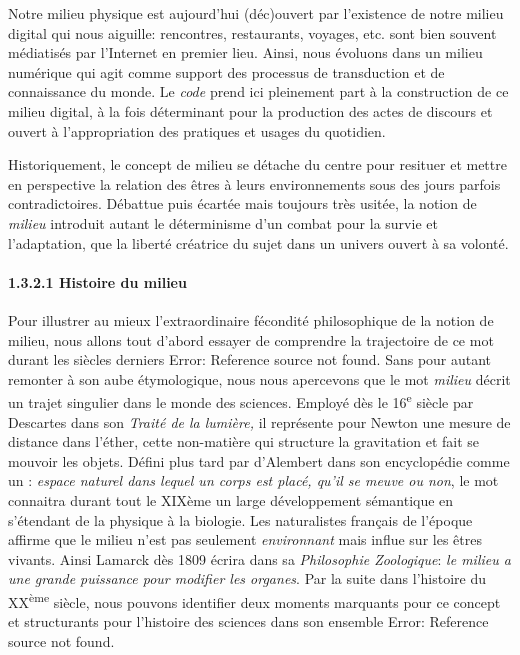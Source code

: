 \bigskip

{\color{black}
Notre milieu physique est aujourd'hui (d\'ec)ouvert par l'existence de notre milieu digital qui
nous aiguille: rencontres, restaurants, voyages, etc. sont bien souvent m\'ediatis\'es par l'Internet en premier lieu.
Ainsi, nous \'evoluons dans un milieu num\'erique qui agit comme support des processus de transduction et de
connaissance du monde. Le \textit{code }prend ici pleinement part \`a la construction de ce milieu digital, \`a la fois
d\'eterminant pour la production des actes de discours et ouvert \`a l'appropriation des pratiques et usages du
quotidien.}


\bigskip

{\color{black}
Historiquement, le concept de milieu se d\'etache du centre pour resituer et mettre en perspective la relation des
\^etres \`a leurs environnements sous des jours parfois contradictoires. D\'ebattue puis \'ecart\'ee mais toujours
tr\`es usit\'ee, la notion de \textit{milieu} introduit autant le d\'eterminisme d'un combat pour la survie et
l'adaptation, que la libert\'e cr\'eatrice du sujet dans un univers ouvert \`a sa volont\'e. }

\paragraph[1.3.2.1 Histoire du milieu ]{1.3.2.1 Histoire du milieu }
\hypertarget{RefHeading271699228146}{}{\sffamily\color{black}
Pour illustrer au mieux l'extraordinaire f\'econdit\'e philosophique de la notion de milieu, nous allons tout d'abord
essayer de comprendre la trajectoire de ce mot durant les si\`ecles derniers Error: Reference source not found. Sans
pour autant remonter \`a son aube \'etymologique, nous nous apercevons que le mot \textit{milieu} d\'ecrit un trajet
singulier dans le monde des sciences. Employ\'e d\`es le 16\textsuperscript{e} si\`ecle par Descartes dans son
\textit{Trait\'e de la lumi\`ere,} il repr\'esente pour Newton une mesure de distance dans l'\'ether, cette
non-mati\`ere qui structure la gravitation et fait se mouvoir les objets. D\'efini plus tard par d'Alembert dans son
encyclop\'edie comme un : \textit{{\textquotedbl}espace naturel dans lequel un corps est plac\'e, qu'il se meuve ou
non{\textquotedbl}}, le mot connaitra durant tout le XIX\`eme un large d\'eveloppement s\'emantique en s'\'etendant de
la physique \`a la biologie. Les naturalistes fran\c{c}ais de l'\'epoque affirme que le milieu n'est pas seulement
\textit{environnant} mais influe sur les \^etres vivants. Ainsi Lamarck d\`es 1809 \'ecrira dans sa \textit{Philosophie
Zoologique}: \textit{{\textquotedbl}le milieu a une grande puissance pour modifier les organes{\textquotedbl}}. Par la
suite dans l'histoire du XX\textsuperscript{\`eme} si\`ecle, nous pouvons identifier deux moments marquants pour ce
concept et structurants pour l'histoire des sciences dans son ensemble Error: Reference source not found. }

